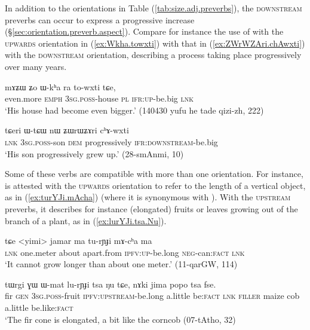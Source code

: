 In addition to the orientations in Table (\ref{tab:size.adj.preverbs}), the \textsc{downstream} preverbs can occur to express a progressive increase (§\ref{sec:orientation.preverb.aspect}). Compare for instance the use of  with the \textsc{upwards} orientation in (\ref{ex:Wkha.towxti})  with that in (\ref{ex:ZWrWZAri.chAwxti}) with the \textsc{downstream} orientation, describing a process taking place progressively over many years.

\begin{exe}
\ex \label{ex:Wkha.towxti}
\gll mɤʑɯ ʑo ɯ-kʰa ra to-wxti tɕe, \\
even.more \textsc{emph} \textsc{3sg}.\textsc{poss}-house \textsc{pl} \textsc{ifr}:\textsc{up}-be.big \textsc{lnk} \\
\glt  `His house had become even bigger.' (140430 yufu he tade qizi-zh, 222)
\end{exe}

\begin{exe}
\ex \label{ex:ZWrWZAri.chAwxti}
\gll tɕeri ɯ-tɕɯ nɯ ʑɯrɯʑɤri cʰɤ-wxti  \\
\textsc{lnk} \textsc{3sg}.\textsc{poss}-son \textsc{dem} progressively \textsc{ifr}:\textsc{downstream}-be.big \\
\glt `His son progressively grew up.' (28-smAnmi, 10)
\end{exe}

Some of these verbs are compatible with more than one orientation. For instance,  is attested with the \textsc{upwards} orientation to refer to the length of a vertical object, as in (\ref{ex:turYJi.mAcha}) (where it is synonymous with ). With the \textsc{upstream} preverbs, it describes for instance (elongated) fruits or leaves growing out of the branch of a plant, as in (\ref{ex:lurYJi.tsa.Nu}).
 
\begin{exe}
\ex \label{ex:turYJi.mAcha}
\gll tɕe <yimi> jamar ma tu-rɲɟi mɤ-cʰa ma  \\
\textsc{lnk} one.meter about apart.from \textsc{ipfv}:\textsc{up}-be.long \textsc{neg}-can:\textsc{fact} \textsc{lnk} \\
\glt `It cannot grow longer than about one meter.' (11-qarGW, 114)
\end{exe}

\begin{exe}
\ex \label{ex:lurYJi.tsa.Nu}
\gll tɯrgi ɣɯ ɯ-mat lu-rɲɟi tsa ŋu tɕe, nɤki jima popo tsa fse. \\
fir \textsc{gen}  \textsc{3sg}.\textsc{poss}-fruit \textsc{ipfv}:\textsc{upstream}-be.long a.little be:\textsc{fact} \textsc{lnk} \textsc{filler} maize cob a.little be.like:\textsc{fact} \\
\glt  `The fir cone is elongated, a bit like the corncob (07-tAtho, 32)
\end{exe}

